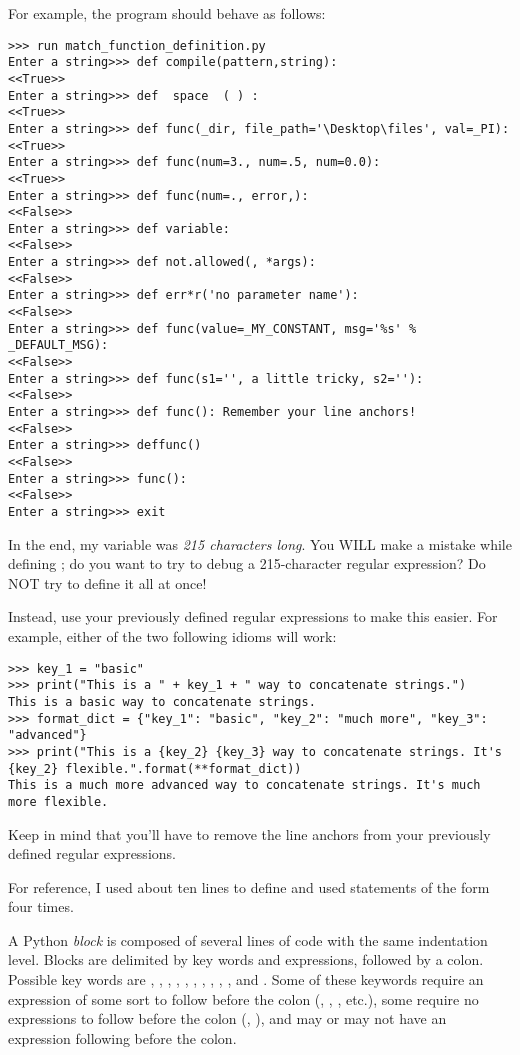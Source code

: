 For example, the program should behave as follows:
\begin{lstlisting}
>>> run match_function_definition.py
Enter a string>>> def compile(pattern,string):
<<True>>
Enter a string>>> def  space  ( ) :
<<True>>
Enter a string>>> def func(_dir, file_path='\Desktop\files', val=_PI):
<<True>>
Enter a string>>> def func(num=3., num=.5, num=0.0):
<<True>>
Enter a string>>> def func(num=., error,):
<<False>>
Enter a string>>> def variable:
<<False>>
Enter a string>>> def not.allowed(, *args):
<<False>>
Enter a string>>> def err*r('no parameter name'):
<<False>>
Enter a string>>> def func(value=_MY_CONSTANT, msg='%s' % _DEFAULT_MSG):
<<False>>
Enter a string>>> def func(s1='', a little tricky, s2=''):
<<False>>
Enter a string>>> def func(): Remember your line anchors!
<<False>>
Enter a string>>> deffunc()
<<False>>
Enter a string>>> func():
<<False>>
Enter a string>>> exit

\end{lstlisting}

\begin{warn}
In the end, my variable  was \emph{215 characters long}. You WILL make a mistake while defining ; do you want to try to debug a 215-character regular expression? Do NOT try to define it all at once!

Instead, use your previously defined regular expressions to make this easier. For example, either of the two following idioms will work:
\begin{lstlisting}
>>> key_1 = "basic"
>>> print("This is a " + key_1 + " way to concatenate strings.")
This is a basic way to concatenate strings.
>>> format_dict = {"key_1": "basic", "key_2": "much more", "key_3": "advanced"}
>>> print("This is a {key_2} {key_3} way to concatenate strings. It's {key_2} flexible.".format(**format_dict))
This is a much more advanced way to concatenate strings. It's much more flexible.
\end{lstlisting}
Keep in mind that you'll have to remove the line anchors from your previously defined regular expressions.

For reference, I used about ten lines to define  and used statements of the form  four times.
\end{warn}

\label{prob:match_function_definition}

A Python \emph{block} is composed of several lines of code with the same indentation level.
Blocks are delimited by key words and expressions, followed by a colon.
Possible key words are , , , , , , , , , , and .
Some of these keywords require an expression of some sort to follow before the colon (, , , etc.), some require no expressions to follow before the colon (, ), and  may or may not have an expression following before the colon.

